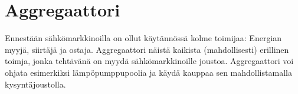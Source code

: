 \section{Aggregaattori}

  Ennestään sähkömarkkinoilla on ollut käytännössä kolme toimijaa: Energian myyjä, siirtäjä ja ostaja. Aggregaattori näistä kaikista (mahdollisesti) erillinen toimja, jonka tehtävänä on myydä sähkömarkkinoille joustoa. Aggregaattori voi ohjata esimerkiksi lämpöpumppupoolia ja käydä kauppaa sen mahdollistamalla kysyntäjoustolla.
